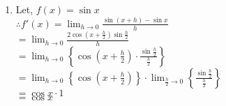 \documentclass[12pt]{article}
\newcommand{\tab}{\hspace*{0.55in}}
\begin{document}
\begin{enumerate}
    \item
    Let, $ f(x) = \sin x $ \\
    $ \therefore f'(x) = \lim_{h \to 0} \frac{\sin(x+h) - \sin x}{h} $ \\
    \tab $ = \lim_{h \to 0} \frac{2 \cos\left(x + \frac{h}{2}\right) \sin \frac{h}{2}}{h} $ \\
    \tab $ = \lim_{h \to 0} \left\{ \cos\left( x + \frac{h}{2} \right) \cdot \frac{\sin \frac{h}{2}}{\frac{h}{2}} \right\} $ \\
    \tab $ = \lim_{h \to 0} \left\{ \cos \left( x + \frac{h}{2} \right) \right\} \cdot \lim_{\frac{h}{2} \to 0} \left\{ \frac{\sin \frac{h}{2}}{\frac{h}{2}} \right\} $ \\
    \tab $ = \cos x \cdot 1 $ \\
    \tab $ = \cos x $
\end{enumerate}
\end{document}

